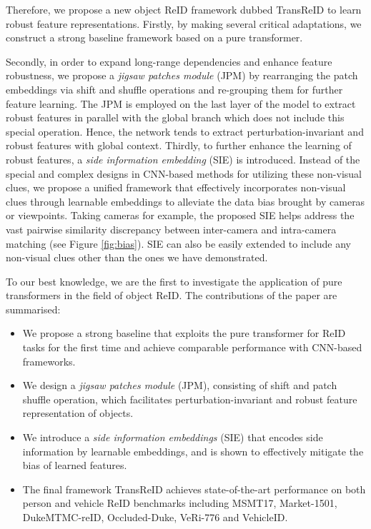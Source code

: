 \documentclass[10pt,twocolumn,letterpaper]{article}
\begin{document}
Therefore, we propose a new object ReID framework dubbed TransReID to learn robust feature representations. Firstly, by making several critical adaptations, we construct a strong baseline framework based on a pure transformer. 

Secondly, in order to expand long-range dependencies and enhance feature robustness, we propose a \textit{jigsaw patches module} (JPM) by rearranging the patch embeddings via shift and shuffle operations and re-grouping them for further feature learning. The JPM is employed on the last layer of the model to extract robust features in parallel with the global branch which does not include this special operation. Hence, the network tends to extract perturbation-invariant and robust features with global context. Thirdly, to further enhance the learning of robust features, a \textit{side information embedding} (SIE) is introduced. Instead of the special and complex designs in CNN-based methods for utilizing these non-visual clues,
we propose a unified framework that effectively incorporates non-visual clues through learnable embeddings to alleviate the data bias brought by cameras or viewpoints. Taking cameras for example, the proposed SIE helps address the vast pairwise similarity discrepancy between inter-camera and intra-camera matching (see Figure \ref{fig:bias}). 
SIE can also be easily extended to include any non-visual clues other than the ones we have demonstrated.


To our best knowledge, we are the first to investigate the application of pure transformers in the field of object ReID. The contributions of the paper are summarised:
\begin{itemize}[noitemsep,nolistsep]
    \item We propose a strong baseline that exploits the pure transformer for ReID tasks for the first time and achieve comparable performance with CNN-based frameworks.
    \item We design a \textit{jigsaw patches module} (JPM), consisting of shift and patch shuffle operation, which facilitates perturbation-invariant and robust feature representation of objects.
    \item We introduce a \textit{side information embeddings} (SIE) that encodes side information by learnable embeddings, and is shown to effectively mitigate the bias of learned features.
    \item The final framework TransReID achieves state-of-the-art performance on both person and vehicle ReID benchmarks including MSMT17\cite{MSMT17}, Market-1501\cite{Market1501}, DukeMTMC-reID\cite{DukeMTMC-reID}, Occluded-Duke\cite{miao2019pose}, VeRi-776\cite{VeRi776} and VehicleID\cite{VehicleID}.
\end{itemize}
%
 
\end{document}

